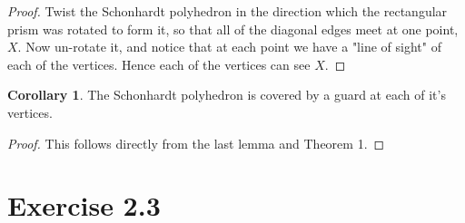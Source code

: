 \documentclass[12pt]{article}
\theoremstyle{definition}
\newtheorem{corollary}{Corollary}
\begin{document}
\begin{proof}

Twist the Schonhardt polyhedron in the direction which the rectangular prism was rotated to form it, so that all of the diagonal edges meet at one point, $X$. Now un-rotate it, and notice that at each point we have a "line of sight" of each of the vertices. Hence each of the vertices can see $X$. 

\end{proof}


\begin{corollary}
The Schonhardt polyhedron is covered by a guard at each of it's vertices. 
\end{corollary}

\begin{proof}
This follows directly from the last lemma and Theorem 1.
\end{proof}



\section{Exercise 2.3}
\end{document}
